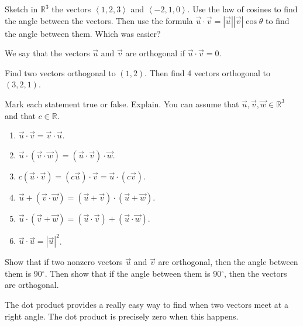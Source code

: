 \begin{problem}\label{dot angle practice}  
Sketch in $\mathbb{R}^3$ the vectors $\left<1,2,3\right>$ and $\left<-2,1,0\right>$.  Use the law of cosines to find the angle between the vectors. Then use the formula $\vec u\cdot \vec v=|\vec u||\vec v|\cos\theta$ to find the angle between them. Which was easier?
\end{problem}

\begin{definition}
We say that the vectors $\vec u$ and $\vec v$ are orthogonal if $\vec u\cdot \vec v=0$. 
\end{definition}

\begin{problem}
Find two vectors orthogonal to $(1,2)$.  Then find 4 vectors orthogonal to $(3,2,1)$.  
\end{problem}

\begin{problem}\label{dot product facts}
Mark each statement true or false. Explain. You can assume that $\vec u,\vec v,\vec w\in\mathbb{R}^3$ and that $c\in\mathbb{R}$.
\begin{enumerate}
\item $\vec u\cdot \vec v=\vec v\cdot \vec u$. 
\item $\vec u\cdot (\vec v\cdot \vec w)=(\vec u\cdot\vec v)\cdot\vec w$. 
\item $c(\vec u\cdot \vec v)=(c\vec u)\cdot \vec v=\vec u\cdot (c\vec v)$. 
\item $\vec u+(\vec v\cdot \vec w)=(\vec u+\vec v)\cdot(\vec u+\vec w)$. 
\item $\vec u\cdot (\vec v+ \vec w)=(\vec u\cdot \vec v)+(\vec u\cdot\vec w)$. 
\item $\vec u\cdot \vec u= |\vec u|^2$. 
\end{enumerate}
\end{problem}

\begin{problem} 
Show that if two nonzero vectors $\vec u$ and $\vec v$ are orthogonal, then the angle between them is 90$^\circ$. Then show that if the angle between them is 90$^\circ$, then the vectors are orthogonal.
\end{problem}
The dot product provides a really easy way to find when two vectors meet at a right angle. The dot product is precisely zero when this happens.

